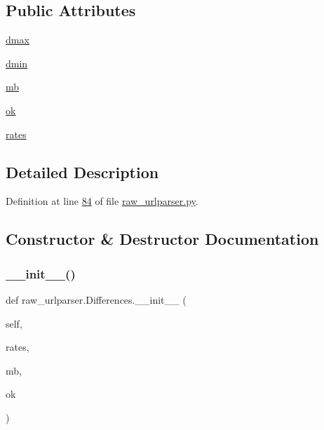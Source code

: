 \subsection*{Public Attributes}
\begin{DoxyCompactItemize}
\item 
\hyperlink{classraw__urlparser_1_1_differences_ad2b06158b655136bc7743dc6ac8d1e2a}{dmax}
\item 
\hyperlink{classraw__urlparser_1_1_differences_af8457a8e542de086595e7fbbffdf713c}{dmin}
\item 
\hyperlink{classraw__urlparser_1_1_differences_ab4c3073b8c569b7791ab3b8e21e9b364}{mb}
\item 
\hyperlink{classraw__urlparser_1_1_differences_a46fe97bedb977585a0b27d7408ace118}{ok}
\item 
\hyperlink{classraw__urlparser_1_1_differences_ad4e7eadb659a1cdcba90793cc52af174}{rates}
\end{DoxyCompactItemize}


\subsection{Detailed Description}


Definition at line \hyperlink{raw__urlparser_8py_source_l00084}{84} of file \hyperlink{raw__urlparser_8py_source}{raw\+\_\+urlparser.\+py}.



\subsection{Constructor \& Destructor Documentation}
\mbox{\label{classraw__urlparser_1_1_differences_ab96f235ba2697e17fea2e3dc83ab2ca0}} 
\subsubsection{\texorpdfstring{\+\_\+\+\_\+init\+\_\+\+\_\+()}{\_\_init\_\_()}}
{\footnotesize\ttfamily def raw\+\_\+urlparser.\+Differences.\+\_\+\+\_\+init\+\_\+\+\_\+ (\begin{DoxyParamCaption}\item[{}]{self,  }\item[{}]{rates,  }\item[{}]{mb,  }\item[{}]{ok }\end{DoxyParamCaption})}




